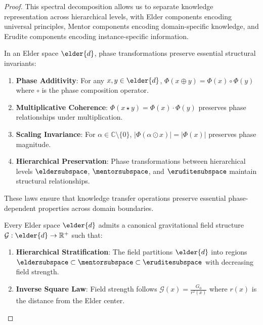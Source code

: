 \begin{proof}
This spectral decomposition allows us to separate knowledge representation across hierarchical levels, with Elder components encoding universal principles, Mentor components encoding domain-specific knowledge, and Erudite components encoding instance-specific information.

\begin{theorem}
\label{thm:phase_conservation_laws}
In an Elder space $\elder{d}$, phase transformations preserve essential structural invariants:
\begin{enumerate}
    \item \textbf{Phase Additivity}: For any $x, y \in \elder{d}$, $\Phi(x \oplus y) = \Phi(x) \circ \Phi(y)$ where $\circ$ is the phase composition operator.
    
    \item \textbf{Multiplicative Coherence}: $\Phi(x \star y) = \Phi(x) \cdot \Phi(y)$ preserves phase relationships under multiplication.
    
    \item \textbf{Scaling Invariance}: For $\alpha \in \mathbb{C} \setminus \{0\}$, $|\Phi(\alpha \odot x)| = |\Phi(x)|$ preserves phase magnitude.
    
    \item \textbf{Hierarchical Preservation}: Phase transformations between hierarchical levels $\eldersubspace$, $\mentorsubspace$, and $\eruditesubspace$ maintain structural relationships.
\end{enumerate}
These laws ensure that knowledge transfer operations preserve essential phase-dependent properties across domain boundaries.
\end{theorem}

\begin{theorem}
\label{thm:gravitational_field_structure}
Every Elder space $\elder{d}$ admits a canonical gravitational field structure $\mathcal{G}: \elder{d} \rightarrow \mathbb{R}^+$ such that:
\begin{enumerate}
    \item \textbf{Hierarchical Stratification}: The field partitions $\elder{d}$ into regions $\eldersubspace \subset \mentorsubspace \subset \eruditesubspace$ with decreasing field strength.
    
    \item \textbf{Inverse Square Law}: Field strength follows $\mathcal{G}(x) = \frac{G_0}{r^2(x)}$ where $r(x)$ is the distance from the Elder center.
    

\end{enumerate}
\end{theorem}
\end{proof}

